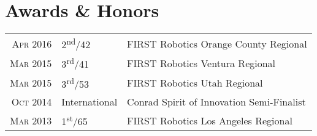 \documentclass{resume_template}
\begin{document}
\section{Awards \& Honors}
\begin{tabular}{rll}
  \textsc{Apr} 2016 & 2\textsuperscript{nd}/42 & FIRST Robotics Orange County Regional\\
  \textsc{Mar} 2015 & 3\textsuperscript{rd}/41 & FIRST Robotics Ventura Regional\\
  \textsc{Mar} 2015 & 3\textsuperscript{rd}/53 & FIRST Robotics Utah Regional\\
  \textsc{Oct} 2014 & International & Conrad Spirit of Innovation Semi-Finalist\\
  \textsc{Mar} 2013 & 1\textsuperscript{st}/65 & FIRST Robotics Los Angeles Regional\\
\end{tabular}
\end{document}
